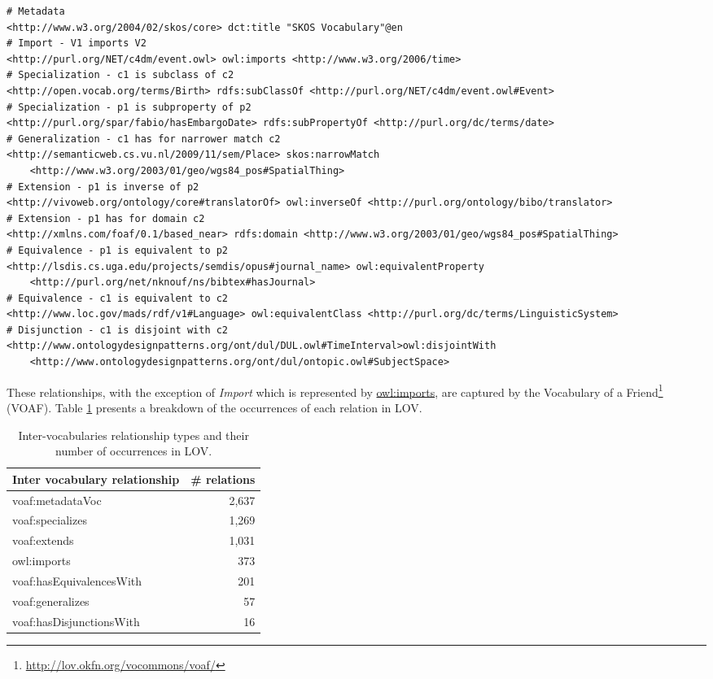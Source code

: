 \documentclass{iosart2c}
\begin{document}
\begin{lstlisting}[float=*,basicstyle=\tiny,label={list:voaf}, language=turtle, caption={Examples of Inter-vocabulary relationships.}]
# Metadata
<http://www.w3.org/2004/02/skos/core> dct:title "SKOS Vocabulary"@en
# Import - V1 imports V2
<http://purl.org/NET/c4dm/event.owl> owl:imports <http://www.w3.org/2006/time>
# Specialization - c1 is subclass of c2
<http://open.vocab.org/terms/Birth> rdfs:subClassOf <http://purl.org/NET/c4dm/event.owl#Event>
# Specialization - p1 is subproperty of p2  
<http://purl.org/spar/fabio/hasEmbargoDate> rdfs:subPropertyOf <http://purl.org/dc/terms/date>
# Generalization - c1 has for narrower match c2 
<http://semanticweb.cs.vu.nl/2009/11/sem/Place> skos:narrowMatch 
    <http://www.w3.org/2003/01/geo/wgs84_pos#SpatialThing>
# Extension - p1 is inverse of p2
<http://vivoweb.org/ontology/core#translatorOf> owl:inverseOf <http://purl.org/ontology/bibo/translator>
# Extension - p1 has for domain c2
<http://xmlns.com/foaf/0.1/based_near> rdfs:domain <http://www.w3.org/2003/01/geo/wgs84_pos#SpatialThing>
# Equivalence - p1 is equivalent to p2
<http://lsdis.cs.uga.edu/projects/semdis/opus#journal_name> owl:equivalentProperty 
    <http://purl.org/net/nknouf/ns/bibtex#hasJournal>
# Equivalence - c1 is equivalent to c2 
<http://www.loc.gov/mads/rdf/v1#Language> owl:equivalentClass <http://purl.org/dc/terms/LinguisticSystem>
# Disjunction - c1 is disjoint with c2
<http://www.ontologydesignpatterns.org/ont/dul/DUL.owl#TimeInterval>owl:disjointWith 
    <http://www.ontologydesignpatterns.org/ont/dul/ontopic.owl#SubjectSpace>
\end{lstlisting}

These relationships, with the exception of \emph{Import} which is represented by \url{owl:imports}, are captured by the Vocabulary of a Friend\footnote{\url{http://lov.okfn.org/vocommons/voaf/}} (VOAF). Table \ref{tab:voaf} presents a breakdown of the occurrences of each relation in LOV.

\begin{table}[h!tb]
\caption{Inter-vocabularies relationship types and their number of occurrences in LOV.}
\begin{tabular}{lr}
\hline
\textbf{Inter vocabulary relationship} & \textbf{\# relations} \\ \hline
voaf:metadataVoc & 2,637 \\
voaf:specializes & 1,269 \\
voaf:extends & 1,031 \\
owl:imports & 373 \\
voaf:hasEquivalencesWith & 201 \\
voaf:generalizes & 57 \\
voaf:hasDisjunctionsWith & 16 \\
\hline  
\end{tabular}
\label{tab:voaf}
\end{table}
\end{document}
